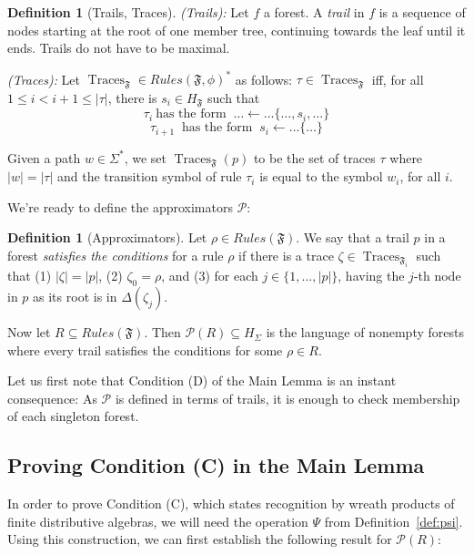 \documentclass[sigplan,9pt]{acmart}\settopmatter{printfolios=true,printccs=false,printacmref=false}
\newcounter{thm}
\newcounter{theorem}
\theoremstyle{definition}
\newtheorem{defin}[thm]{Definition}
\newcommand{\Ff}[0]{{\mathfrak{F}}}
\newcommand{\Pa}[0]{{\mathcal{P}}}
\newcommand{\Trace}[0]{\operatorname{Traces}}
\begin{document}
\begin{defin}[Trails, Traces]
\emph{(Trails):}
Let $f$ a forest. A \emph{trail} in $f$ is a sequence of nodes starting at the root of one member tree, continuing towards the leaf until it ends. Trails do not have to be maximal.

\emph{(Traces):} Let $\Trace_\Ff \in Rules(\Ff,\phi)^*$ as follows: %
$\tau \in \Trace_\Ff$ iff, for all $1 \leq i < i+1 \leq |\tau|$, there is $s_i \in H_\Ff$ such that
$$\tau_i\ \text{has the form }\ \dots \leftarrow \dots \{\dots, s_i, \dots\}$$
$$\tau_{i+1}\ \text{ has the form }\ s_i \leftarrow \dots \{\dots\}$$

Given a path $w \in \Sigma^*$, we set $\Trace_\Ff(p)$ to be the set of traces $\tau$ where $|w| = |\tau|$ and the transition symbol of rule $\tau_i$ is equal to the symbol $w_i$, for all $i$.
\end{defin}

We're ready to define the approximators $\Pa$:

\begin{defin}[Approximators]\label{def:p}
Let $\rho \in Rules(\Ff)$. 
We say that a trail $p$ in a forest \emph{satisfies the conditions} for a rule $\rho$ if there is a trace $\zeta \in \Trace_{\Ff_i}$ such that (1) $|\zeta| = |p|$, (2) $\zeta_0 = \rho$, and (3) for each $j \in \{1, ..., |p|\}$, having the $j$-th node in $p$ as its root is in $\Delta(\zeta_j)$.

Now let $R \subseteq Rules(\Ff)$. Then $\Pa(R) \subseteq H_\Sigma$ is the language of nonempty forests where every trail satisfies the conditions for some $\rho \in R$. %



\end{defin}



Let us first note that Condition (D) of the Main Lemma is an instant consequence: As $\Pa$ is defined in terms of trails, it is enough to check membership of each singleton forest.

\subsection{Proving Condition (C) in the Main Lemma}
In order to prove Condition (C), which states recognition by wreath products of finite distributive algebras, we will need the operation $\Psi$ from Definition~\ref{def:psi}.
Using this construction, we can first establish the following result for $\Pa(R)$:
\end{document}
